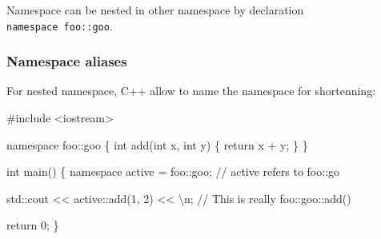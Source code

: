 \documentclass[
  letterpaper,
  DIV=11,
  numbers=noendperiod]{scrreprt}
\newenvironment{Shaded}{\begin{snugshade}}{\end{snugshade}}
\newcommand{\CommentTok}[1]{\textcolor[rgb]{0.37,0.37,0.37}{#1}}
\newcommand{\DecValTok}[1]{\textcolor[rgb]{0.68,0.00,0.00}{#1}}
\newcommand{\ErrorTok}[1]{\textcolor[rgb]{0.68,0.00,0.00}{#1}}
\newcommand{\FunctionTok}[1]{\textcolor[rgb]{0.28,0.35,0.67}{#1}}
\newcommand{\NormalTok}[1]{\textcolor[rgb]{0.00,0.23,0.31}{#1}}
\newcommand{\OtherTok}[1]{\textcolor[rgb]{0.00,0.23,0.31}{#1}}
\newcommand{\SpecialCharTok}[1]{\textcolor[rgb]{0.37,0.37,0.37}{#1}}
\newcommand{\StringTok}[1]{\textcolor[rgb]{0.13,0.47,0.30}{#1}}
\begin{document}
Namespace can be nested in other namespace by declaration
\texttt{namespace\ foo::goo}.

\hypertarget{namespace-aliases}{%
\subsubsection{Namespace aliases}\label{namespace-aliases}}

For nested namespace, C++ allow to name the namespace for shortenning:

\begin{Shaded}
\begin{Highlighting}[]
\CommentTok{\#include \textless{}iostream\textgreater{}}

\NormalTok{namespace foo}\SpecialCharTok{::}\NormalTok{goo}
\NormalTok{\{}
\NormalTok{  int }\FunctionTok{add}\NormalTok{(int x, int y)}
\NormalTok{  \{}
\NormalTok{    return x }\SpecialCharTok{+}\NormalTok{ y;}
\NormalTok{  \}}
\NormalTok{\}}

\NormalTok{int }\FunctionTok{main}\NormalTok{()}
\NormalTok{\{}
\NormalTok{  namespace active }\OtherTok{=}\NormalTok{ foo}\SpecialCharTok{::}\NormalTok{goo;  }\SpecialCharTok{/}\ErrorTok{/}\NormalTok{ active refers to foo}\SpecialCharTok{::}\NormalTok{go}
  
\NormalTok{  std}\SpecialCharTok{::}\NormalTok{cout }\SpecialCharTok{\textless{}}\ErrorTok{\textless{}}\NormalTok{ active}\SpecialCharTok{::}\FunctionTok{add}\NormalTok{(}\DecValTok{1}\NormalTok{, }\DecValTok{2}\NormalTok{) }\SpecialCharTok{\textless{}}\ErrorTok{\textless{}} \StringTok{\textquotesingle{}}\SpecialCharTok{\textbackslash{}n}\StringTok{\textquotesingle{}}\NormalTok{; }\SpecialCharTok{/}\ErrorTok{/}\NormalTok{ This is really foo}\SpecialCharTok{::}\NormalTok{goo}\SpecialCharTok{::}\FunctionTok{add}\NormalTok{()}
  
\NormalTok{  return }\DecValTok{0}\NormalTok{;}
\NormalTok{\}}
\end{Highlighting}
\end{Shaded}
\end{document}
